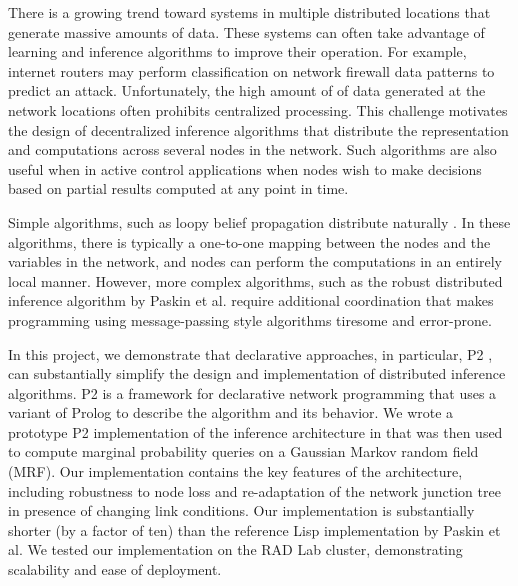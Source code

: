 There is a growing trend toward systems in multiple distributed locations that
generate massive amounts of data. These systems can often take advantage of
learning and inference algorithms to improve their operation. For example,
internet routers may perform classification on network firewall data patterns
to predict an attack. Unfortunately, the high amount of of data generated at
the network locations often prohibits centralized processing. This challenge
motivates the design of decentralized inference algorithms that distribute the
representation and computations across several nodes in the network. Such
algorithms are also useful when in active control applications when nodes wish
to make decisions based on partial results computed at any point in time.

Simple algorithms, such as loopy belief propagation distribute naturally
\cite{loopy}. In these algorithms, there is typically a one-to-one mapping
between the nodes and the variables in the network, and nodes can perform the
computations in an entirely local manner. However, more complex algorithms,
such as the robust distributed inference algorithm by Paskin et al.
\cite{ipsn} require additional coordination that makes programming using
message-passing style algorithms tiresome and error-prone.

In this project, we demonstrate that declarative approaches, in particular, P2
\cite{p2}, can substantially simplify the design and implementation of
distributed inference algorithms. P2 is a framework for declarative network
programming that uses a variant of Prolog to describe the algorithm and its
behavior. We wrote a prototype P2 implementation of the inference architecture
in \cite{ipsn} that was then used to compute marginal probability queries on a
Gaussian Markov random field (MRF). Our implementation contains the key
features of the architecture, including robustness to node loss and
re-adaptation of the network junction tree in presence of changing link
conditions. Our implementation is substantially shorter (by a factor of ten)
than the reference Lisp implementation by Paskin et al. We tested our
implementation on the RAD Lab cluster, demonstrating scalability and ease of
deployment.


